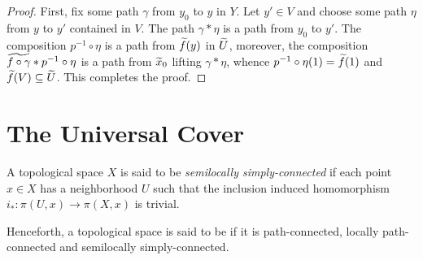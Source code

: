 \begin{proof}
    First, fix some path $\gamma$ from $y_0$ to $y$ in $Y$. Let $y'\in V$ and choose some path $\eta$ from $y$ to $y'$ contained in $V$. The path $\gamma\ast\eta$ is a path from $y_0$ to $y'$. The composition $p^{-1}\circ\eta$ is a path from $\widetilde{f}(y)$ in $\widetilde{U}$, moreover, the composition $\widetilde{f\circ\gamma} * p^{-1}\circ\eta$ is a path from $\widetilde{x}_0$ lifting $\gamma*\eta$, whence $p^{-1}\circ\eta(1) = \widetilde{f}(1)$ and $\widetilde{f}(V)\subseteq\widetilde{U}$. This completes the proof.
\end{proof}


\section{The Universal Cover}

\begin{definition}
    A topological space $X$ is said to be \textit{semilocally simply-connected} if each point $x\in X$ has a neighborhood $U$ such that the inclusion induced homomorphism $i_*:\pi(U, x)\to\pi(X,x)$ is trivial.
\end{definition}

Henceforth, a topological space is said to be \nice if it is path-connected, locally path-connected and semilocally simply-connected.

